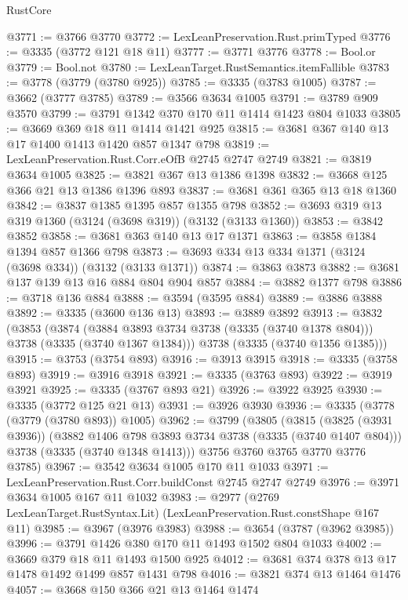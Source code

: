 \begin{lexlean}{RustCore}
\begin{coremodule}
@3771 := @3766 @3770
@3772 := LexLeanPreservation.Rust.primTyped
@3776 := @3335 (@3772 @121 @18 @11)
@3777 := @3771 @3776
@3778 := Bool.or
@3779 := Bool.not
@3780 := LexLeanTarget.RustSemantics.itemFallible
@3783 := @3778 (@3779 (@3780 @925))
@3785 := @3335 (@3783 @1005)
@3787 := @3662 (@3777 @3785)
@3789 := @3566 @3634 @1005
@3791 := @3789 @909 @3570
@3799 := @3791 @1342 @370 @170 @11 @1414 @1423 @804 @1033
@3805 := @3669 @369 @18 @11 @1414 @1421 @925
@3815 := @3681 @367 @140 @13 @17 @1400 @1413 @1420 @857 @1347 @798
@3819 := LexLeanPreservation.Rust.Corr.eOfB @2745 @2747 @2749
@3821 := @3819 @3634 @1005
@3825 := @3821 @367 @13 @1386 @1398
@3832 := @3668 @125 @366 @21 @13 @1386 @1396 @893
@3837 := @3681 @361 @365 @13 @18 @1360
@3842 := @3837 @1385 @1395 @857 @1355 @798
@3852 := @3693 @319 @13 @319 @1360 (@3124 (@3698 @319)) (@3132 (@3133 @1360))
@3853 := @3842 @3852
@3858 := @3681 @363 @140 @13 @17 @1371
@3863 := @3858 @1384 @1394 @857 @1366 @798
@3873 := @3693 @334 @13 @334 @1371 (@3124 (@3698 @334)) (@3132 (@3133 @1371))
@3874 := @3863 @3873
@3882 := @3681 @137 @139 @13 @16 @884 @804 @904 @857
@3884 := @3882 @1377 @798
@3886 := @3718 @136 @884
@3888 := @3594 (@3595 @884)
@3889 := @3886 @3888
@3892 := @3335 (@3600 @136 @13)
@3893 := @3889 @3892
@3913 := @3832
    (@3853
      (@3874 (@3884 @3893 @3734 @3738 (@3335 (@3740 @1378 @804))) @3738 (@3335 (@3740 @1367 @1384)))
      @3738
      (@3335 (@3740 @1356 @1385)))
@3915 := @3753 (@3754 @893)
@3916 := @3913 @3915
@3918 := @3335 (@3758 @893)
@3919 := @3916 @3918
@3921 := @3335 (@3763 @893)
@3922 := @3919 @3921
@3925 := @3335 (@3767 @893 @21)
@3926 := @3922 @3925
@3930 := @3335 (@3772 @125 @21 @13)
@3931 := @3926 @3930
@3936 := @3335 (@3778 (@3779 (@3780 @893)) @1005)
@3962 := @3799
    (@3805
      (@3815
        (@3825 (@3931 @3936))
        (@3882 @1406 @798 @3893 @3734 @3738 (@3335 (@3740 @1407 @804)))
        @3738
        (@3335 (@3740 @1348 @1413)))
      @3756
      @3760
      @3765
      @3770
      @3776
      @3785)
@3967 := @3542 @3634 @1005 @170 @11 @1033
@3971 := LexLeanPreservation.Rust.Corr.buildConst @2745 @2747 @2749
@3976 := @3971 @3634 @1005 @167 @11 @1032
@3983 := @2977 (@2769 LexLeanTarget.RustSyntax.Lit) (LexLeanPreservation.Rust.constShape @167 @11)
@3985 := @3967 (@3976 @3983)
@3988 := @3654 (@3787 (@3962 @3985))
@3996 := @3791 @1426 @380 @170 @11 @1493 @1502 @804 @1033
@4002 := @3669 @379 @18 @11 @1493 @1500 @925
@4012 := @3681 @374 @378 @13 @17 @1478 @1492 @1499 @857 @1431 @798
@4016 := @3821 @374 @13 @1464 @1476
@4057 := @3668
    @150
    @366
    @21
    @13
    @1464
    @1474

\end{coremodule}
\end{lexlean}
